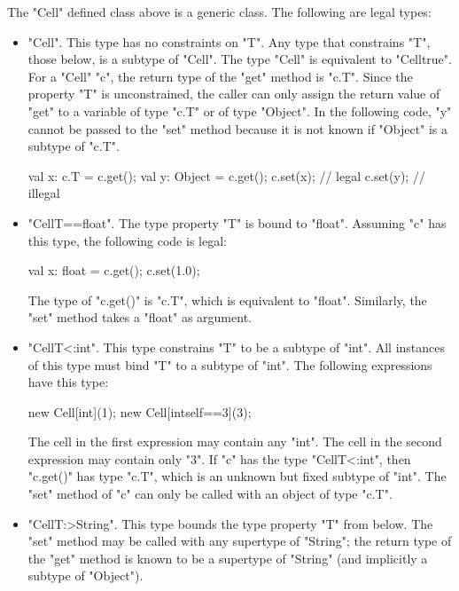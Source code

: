 \documentclass[preprint,nocopyrightspace,9pt]{sigplanconf}
\begin{document}
The \xcd"Cell" defined class above is a generic class.
The following are legal types:
\begin{itemize}
\item \xcd"Cell".  This type has no constraints on \xcd"T".
Any type that constrains \xcd"T", those below,
is a subtype of \xcd"Cell".  The type \xcd"Cell" is equivalent to
\xcd"Cell{true}".
%
For a \xcd"Cell" \xcd"c", the return type of the \xcd"get" method
is \xcd"c.T".
Since the property \xcd"T" is unconstrained,
the caller can only assign the return value of \xcd"get"
to a variable of type \xcd"c.T" or of type \xcd"Object".
In the following code, \xcd"y" cannot be passed to the \xcd"set" method
because it is not known if \xcd"Object" is a subtype of \xcd"c.T".
\begin{xten}
val x: c.T = c.get();
val y: Object = c.get();
c.set(x); // legal
c.set(y); // illegal
\end{xten}

\item \xcd"Cell{T==float}".
The type property \xcd"T" is bound to \xcd"float".
Assuming \xcd"c" has this type, the following code is legal:
\begin{xten}
val x: float = c.get();
c.set(1.0);
\end{xten}
The type of \xcd"c.get()" is \xcd"c.T", which is equivalent to
\xcd"float".
Similarly, the \xcd"set" method takes a \xcd"float" as argument.

\item \xcd"Cell{T<:int}".
This type constrains \xcd"T" to be a subtype of \xcd"int".
All instances of this type must bind \xcd"T" to a subtype of \xcd"int".
The following expressions have this type:
\begin{xten}
new Cell[int](1);
new Cell[int{self==3}](3);
\end{xten}
The cell in the first expression may contain any \xcd"int".
The cell in the second expression may contain only \xcd"3".
%
If \xcd"c" has the type \xcd"Cell{T<:int}",
then \xcd"c.get()" has type \xcd"c.T", which is an unknown but
fixed subtype of \xcd"int".  The \xcd"set" method of \xcd"c" can
only be called with an object of type \xcd"c.T".

\item \xcd"Cell{T:>String}".  This type bounds the type property
\xcd"T"
from below.  The \xcd"set" method may be called with any
supertype of \xcd"String"; the return type of the \xcd"get"
method is known to be a
supertype of \xcd"String" (and implicitly a subtype of \xcd"Object").
\end{itemize}
\end{document}
